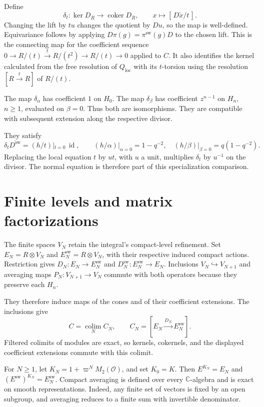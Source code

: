 Define
\begin{equation}\label{v4-arith:ic:w10-d:local:eq:bockstein}
 \delta_t:\ker D_{\overline R}\longrightarrow\operatorname{coker} D_{\overline R},
 \qquad x\longmapsto[\,D\widetilde x/t\,].
\end{equation}
Changing the lift by $tu$ changes the quotient by $Du$, so the map is well-defined.
Equivariance follows by applying $D\pi(g)=\pi^\mathrm{sw}(g)D$ to the chosen lift.
This is the connecting map for the coefficient sequence
$0\to R/(t)\xrightarrow{t}R/(t^2)\to R/(t)\to0$ applied to $C$.
It also identifies the kernel calculated from the free resolution of $Q_{\mathrm{loc}}$
with its $t$-torsion using the resolution $[R\xrightarrow{t}R]$ of $R/(t)$.

The map $\delta_\alpha$ has coefficient $1$ on $H_0$.
The map $\delta_\beta$ has coefficient $z^{n-1}$ on $H_n$, $n\ge1$, evaluated on $\beta=0$.
Thus both are isomorphisms.
They are compatible with subsequent extension along the respective divisor.

They satisfy
\[
 \delta_t\overline {D^\mathrm{sw}}=(h/t)|_{t=0}\,\operatorname{id},
 \qquad
 (h/\alpha)|_{\alpha=0}=1-q^{-2},\quad
 (h/\beta)|_{\beta=0}=q(1-q^{-2}).
\]
Replacing the local equation $t$ by $ut$, with $u$ a unit, multiplies $\delta_t$ by $u^{-1}$ on the divisor.
The normal equation is therefore part of this specialization comparison.

\section{Finite levels and matrix factorizations}

The finite spaces $V_N$ retain the integral's compact-level refinement.
Set $E_N=R\otimes V_N$ and $E_N^\mathrm{sw}=R\otimes V_N$, with their respective induced compact actions.
Restriction gives $D_N:E_N\to E_N^\mathrm{sw}$ and $D_N^\mathrm{sw}:E_N^\mathrm{sw}\to E_N$.
Inclusions $V_N\hookrightarrow V_{N+1}$ and averaging maps $P_N:V_{N+1}\to V_N$
commute with both operators because they preserve each $H_n$.

They therefore induce maps of the cones and of their coefficient extensions.
The inclusions give
\[
 C=\operatorname*{colim}_N C_N,\qquad C_N=[E_N\xrightarrow{D_N}E_N^\mathrm{sw}].
\]
Filtered colimits of modules are exact, so kernels, cokernels, and the displayed coefficient extensions commute with this colimit.

For $N\ge1$, let $K_N=1+\varpi^NM_2(\mathcal O)$, and set $K_0=K$.
Then $E^{K_N}=E_N$ and $(E^\mathrm{sw})^{K_N}=E_N^\mathrm{sw}$.
Compact averaging is defined over every $\mathbb C$-algebra and is exact on smooth representations.
Indeed, any finite set of vectors is fixed by an open subgroup, and averaging reduces to a finite sum with invertible denominator.

